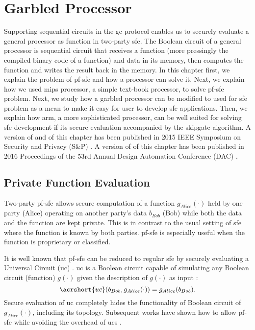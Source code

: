 \chapter{Garbled Processor}\label{chap:processor}
Supporting sequential circuits in the \acrshort{gc} protocol enables us to securely evaluate a general processor as function in two-party \acrshort{sfe}.
The Boolean circuit of a general processor is sequential circuit that receives a function (more pressingly the compiled binary code of a function) and data in its memory, then computes the function and writes the result back in the memory.
In this chapter first, we explain the problem of \acrfull{pf-sfe} and how a processor can solve it.
Next, we explain how we used \gls{mips} processor, a simple text-book processor, to solve \acrshort{pf-sfe} problem.
Next, we study how a garbled processor can be modified to used for \acrshort{sfe} problem as a mean to make it easy for user to develop \acrshort{sfe} applications.
Then, we explain how \gls{arm}, a more sophisticated processor, can be well suited for solving \acrshort{sfe} development if its secure evaluation accompanied by the \gls{skipgate} algorithm.
A version of  and  of this chapter has been published in 2015 IEEE Symposium on Security and Privacy (S\&P) \cite{songhori2015tinygarble}.
A version of  of this chapter has been published in 2016 Proceedings of the 53rd Annual Design Automation Conference (DAC) \cite{songhori2016garbledcpu}.


\section{Private Function Evaluation}\label{sec:processor-pfsfe}
Two-party \acrfull{pf-sfe} allows secure computation of a function $g_{Alice}(\cdot)$ held by one party (Alice) operating on another party's data $b_{Bob}$ (Bob) while both the data and the function are kept private.
This is in contrast to the usual setting of \acrshort{sfe} where the function is known by both parties.
\acrshort{pf-sfe} is especially useful when the function is proprietary or classified.

It is well known that \acrshort{pf-sfe} can be reduced to regular \acrshort{sfe} by securely evaluating a Universal Circuit (\acrshort{uc}) \cite{sander1999non}.
\acrshort{uc} is a Boolean circuit capable of simulating any Boolean circuit (function) $g(\cdot)$ given the description of $g(\cdot)$ as input \cite{valiant1976universal,kolesnikov2008practical}:
$$\acrshort{uc}(b_{Bob},g_{Alice}(\cdot)) = g_{Alice}(b_{Bob}).$$
Secure evaluation of \acrshort{uc} completely hides the functionality of Boolean circuit of $g_{Alice}(\cdot)$, including its topology.
Subsequent works have shown how to allow \acrshort{pf-sfe} while avoiding the overhead of \acrshort{uc}s \cite{katz2011constant, mohassel2013hide}.

